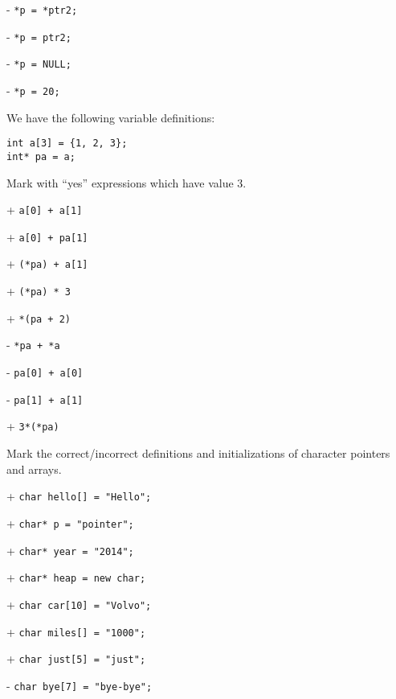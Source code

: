 - \verb|*p = *ptr2;|

- \verb|*p = ptr2;|

- \verb|*p = NULL;|

- \verb|*p = 20;|

We have the following variable definitions:
 \vspace{-3mm}\begin{verbatim}
int a[3] = {1, 2, 3};
int* pa = a;
 \end{verbatim}\vspace{-6mm}
Mark with ``yes'' expressions which have value 3.

+ \verb|a[0] + a[1]|

+ \verb|a[0] + pa[1]|

+ \verb|(*pa) + a[1]|

+ \verb|(*pa) * 3|

+ \verb|*(pa + 2)|

- \verb|*pa + *a|

- \verb|pa[0] + a[0]|

- \verb|pa[1] + a[1]|

+ \verb|3*(*pa)|

Mark the correct/incorrect definitions and initializations 
of character pointers and arrays.

+ \verb|char hello[] = "Hello";|

+ \verb|char* p = "pointer";|

+ \verb|char* year = "2014";|

+ \verb|char* heap = new char;|

+ \verb|char car[10] = "Volvo";|

+ \verb|char miles[] = "1000";|

+ \verb|char just[5] = "just";|

- \verb|char bye[7] = "bye-bye";|

